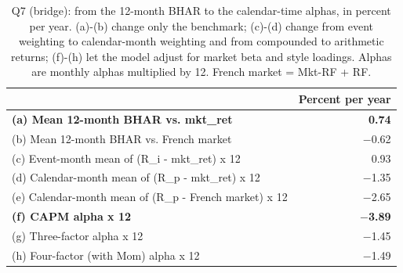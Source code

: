 \begin{table}[!htbp]
\centering
\small
\caption{Q7 (bridge): from the 12-month BHAR to the calendar-time alphas, in percent per year. (a)-(b) change only the benchmark; (c)-(d) change from event weighting to calendar-month weighting and from compounded to arithmetic returns; (f)-(h) let the model adjust for market beta and style loadings. Alphas are monthly alphas multiplied by 12. French market = Mkt-RF + RF.}
\label{tab:q7}
\begin{tabular}{p{9cm}r}
\toprule
 & Percent per year \\
\midrule
\rowcolor[gray]{0.94} \textbf{(a) Mean 12-month BHAR vs. mkt\_ret} & \textbf{0.74} \\
(b) Mean 12-month BHAR vs. French market & $-$0.62 \\
\addlinespace
(c) Event-month mean of (R\_i - mkt\_ret) x 12 & 0.93 \\
(d) Calendar-month mean of (R\_p - mkt\_ret) x 12 & $-$1.35 \\
(e) Calendar-month mean of (R\_p - French market) x 12 & $-$2.65 \\
\addlinespace
\rowcolor[gray]{0.94} \textbf{(f) CAPM alpha x 12} & \textbf{$-$3.89} \\
(g) Three-factor alpha x 12 & $-$1.45 \\
(h) Four-factor (with Mom) alpha x 12 & $-$1.49 \\
\bottomrule
\end{tabular}
\end{table}
